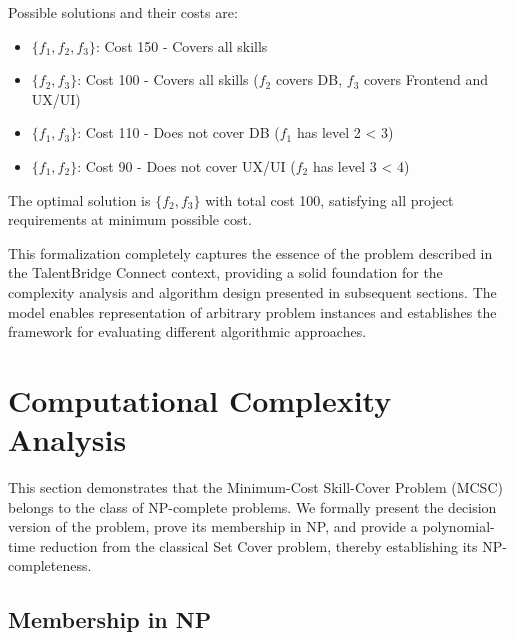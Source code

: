 \documentclass[12pt,a4paper]{article}
\begin{document}
Possible solutions and their costs are:
\begin{itemize}
	\item $\{f_1, f_2, f_3\}$: Cost 150 - Covers all skills
	\item $\{f_2, f_3\}$: Cost 100 - Covers all skills ($f_2$ covers DB, $f_3$ covers Frontend and UX/UI)
	\item $\{f_1, f_3\}$: Cost 110 - Does not cover DB ($f_1$ has level 2 < 3)
	\item $\{f_1, f_2\}$: Cost 90 - Does not cover UX/UI ($f_2$ has level 3 < 4)
\end{itemize}

The optimal solution is $\{f_2, f_3\}$ with total cost 100, satisfying all project requirements at minimum possible cost.

This formalization completely captures the essence of the problem described in the TalentBridge Connect context, providing a solid foundation for the complexity analysis and algorithm design presented in subsequent sections. The model enables representation of arbitrary problem instances and establishes the framework for evaluating different algorithmic approaches.

\section{Computational Complexity Analysis}
\label{sec:complexity}

This section demonstrates that the Minimum-Cost Skill-Cover Problem (MCSC) belongs to the class of NP-complete problems. We formally present the decision version of the problem, prove its membership in NP, and provide a polynomial-time reduction from the classical Set Cover problem, thereby establishing its NP-completeness.

\subsection{Membership in NP}
\label{subsec:membership-np}
\end{document}
